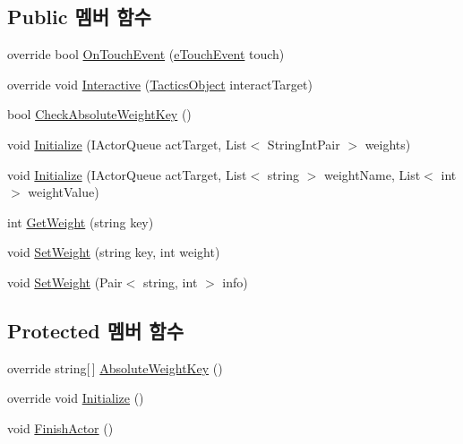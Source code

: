 \subsection*{Public 멤버 함수}
\begin{DoxyCompactItemize}
\item 
override bool \hyperlink{class_attack_actor_a471c22dd21a49e9676a0e9d276cba709}{On\+Touch\+Event} (\hyperlink{_touch_manager_8cs_ae33e321a424fe84ba8b2fdb81ad40a68}{e\+Touch\+Event} touch)
\item 
override void \hyperlink{class_attack_actor_a766e164877bf499175dfb091967198a5}{Interactive} (\hyperlink{class_tactics_object}{Tactics\+Object} interact\+Target)
\item 
bool \hyperlink{class_f_z_1_1_actor_aa78fa8d765cfc56474c3714d38bcc13b}{Check\+Absolute\+Weight\+Key} ()
\item 
void \hyperlink{class_f_z_1_1_actor_ac29de02b4c3cc1012143f6531f5809ed}{Initialize} (I\+Actor\+Queue act\+Target, List$<$ String\+Int\+Pair $>$ weights)
\item 
void \hyperlink{class_f_z_1_1_actor_a968a8b42fa52f121bdcc9c8ea8136eb9}{Initialize} (I\+Actor\+Queue act\+Target, List$<$ string $>$ weight\+Name, List$<$ int $>$ weight\+Value)
\item 
int \hyperlink{class_f_z_1_1_actor_ab6dee08c1296f3c020694fd9408b7c33}{Get\+Weight} (string key)
\item 
void \hyperlink{class_f_z_1_1_actor_a0f36cb598cc81fc94bf5de590382004e}{Set\+Weight} (string key, int weight)
\item 
void \hyperlink{class_f_z_1_1_actor_a6c257b538187513e247b92905da53954}{Set\+Weight} (Pair$<$ string, int $>$ info)
\end{DoxyCompactItemize}
\subsection*{Protected 멤버 함수}
\begin{DoxyCompactItemize}
\item 
override string\mbox{[}$\,$\mbox{]} \hyperlink{class_attack_actor_af120af42f4607f14a61928429f84eba5}{Absolute\+Weight\+Key} ()
\item 
override void \hyperlink{class_attack_actor_a6ecde7d8728f53eb75e5f5547deeec8e}{Initialize} ()
\item 
void \hyperlink{class_f_z_1_1_actor_a26e516ab18ada56bb6a9e26c8fd6b709}{Finish\+Actor} ()
\end{DoxyCompactItemize}
